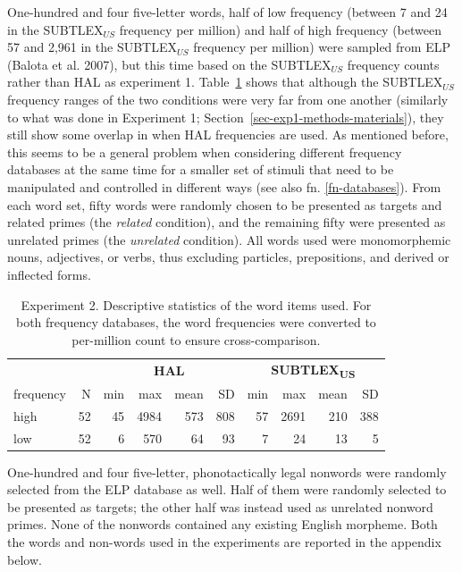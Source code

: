 \documentclass[
]{interact}
\begin{document}
One-hundred and four five-letter words, half of low frequency (between 7
and 24 in the SUBTLEX\(_{US}\) frequency per million) and half of high
frequency (between 57 and 2,961 in the SUBTLEX\(_{US}\) frequency per
million) were sampled from ELP (Balota et al. 2007), but this time based
on the SUBTLEX\(_{US}\) frequency counts rather than HAL as experiment
1. Table~\ref{tbl-words_exp2} shows that although the SUBTLEX\(_{US}\)
frequency ranges of the two conditions were very far from one another
(similarly to what was done in Experiment 1;
Section~\ref{sec-exp1-methods-materials}), they still show some overlap
in when HAL frequencies are used. As mentioned before, this seems to be
a general problem when considering different frequency databases at the
same time for a smaller set of stimuli that need to be manipulated and
controlled in different ways (see also fn. \ref{fn-databases}). From
each word set, fifty words were randomly chosen to be presented as
targets and related primes (the \emph{related} condition), and the
remaining fifty were presented as unrelated primes (the \emph{unrelated}
condition). All words used were monomorphemic nouns, adjectives, or
verbs, thus excluding particles, prepositions, and derived or inflected
forms.

\begin{longtable}{lrrrrrrrrr}

\caption{\label{tbl-words_exp2}Experiment 2. Descriptive statistics of
the word items used. For both frequency databases, the word frequencies
were converted to per-million count to ensure cross-comparison.}

\tabularnewline

\toprule
 &  & \multicolumn{4}{c}{\textbf{HAL}} & \multicolumn{4}{c}{\textbf{SUBTLEX\textsubscript{US}}} \\ 
\cmidrule(lr){3-6} \cmidrule(lr){7-10}
frequency & N & min & max & mean & SD & min & max & mean & SD \\ 
\midrule\addlinespace[2.5pt]
high & 52 & 45 & 4984 & 573 & 808 & 57 & 2691 & 210 & 388 \\ 
low & 52 & 6 & 570 & 64 & 93 & 7 & 24 & 13 & 5 \\ 
\bottomrule

\end{longtable}

One-hundred and four five-letter, phonotactically legal nonwords were
randomly selected from the ELP database as well. Half of them were
randomly selected to be presented as targets; the other half was instead
used as unrelated nonword primes. None of the nonwords contained any
existing English morpheme. Both the words and non-words used in the
experiments are reported in the appendix below.
\end{document}
